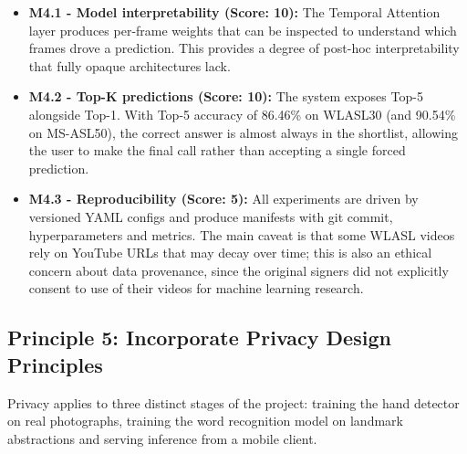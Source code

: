 \begin{itemize}
    \item \textbf{M4.1 - Model interpretability (Score: 10):} The Temporal Attention layer produces per-frame weights that can be inspected to understand which frames drove a prediction. This provides a degree of post-hoc interpretability that fully opaque architectures lack.
    \item \textbf{M4.2 - Top-K predictions (Score: 10):} The system exposes Top-5 alongside Top-1. With Top-5 accuracy of 86.46\% on WLASL30 (and 90.54\% on MS-ASL50), the correct answer is almost always in the shortlist, allowing the user to make the final call rather than accepting a single forced prediction.
    \item \textbf{M4.3 - Reproducibility (Score: 5):} All experiments are driven by versioned YAML configs and produce manifests with git commit, hyperparameters and metrics. The main caveat is that some WLASL videos rely on YouTube URLs that may decay over time; this is also an ethical concern about data provenance, since the original signers did not explicitly consent to use of their videos for machine learning research.
\end{itemize}

\subsection{Principle 5: Incorporate Privacy Design Principles}

Privacy applies to three distinct stages of the project: training the hand detector on real
photographs, training the word recognition model on landmark abstractions and serving inference
from a mobile client.

